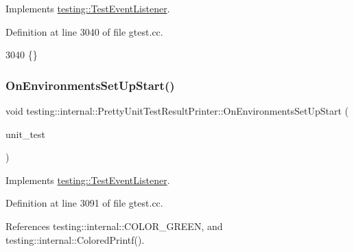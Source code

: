 Implements \hyperlink{classtesting_1_1TestEventListener_aaa1021d75f5dbf3f05c829c1cc520341}{testing\+::\+Test\+Event\+Listener}.



Definition at line 3040 of file gtest.\+cc.


\begin{DoxyCode}
3040 \{\}
\end{DoxyCode}
\mbox{\label{classtesting_1_1internal_1_1PrettyUnitTestResultPrinter_a846a5e82b421e04fcdd2b1b2b64b162f}} 
\subsubsection{\texorpdfstring{On\+Environments\+Set\+Up\+Start()}{OnEnvironmentsSetUpStart()}}
{\footnotesize\ttfamily void testing\+::internal\+::\+Pretty\+Unit\+Test\+Result\+Printer\+::\+On\+Environments\+Set\+Up\+Start (\begin{DoxyParamCaption}\item[{const \hyperlink{classtesting_1_1UnitTest}{Unit\+Test} \&}]{unit\+\_\+test }\end{DoxyParamCaption})\hspace{0.3cm}{\ttfamily [virtual]}}



Implements \hyperlink{classtesting_1_1TestEventListener_aa6502e534919605be45f26a6daf9a40c}{testing\+::\+Test\+Event\+Listener}.



Definition at line 3091 of file gtest.\+cc.



References testing\+::internal\+::\+C\+O\+L\+O\+R\+\_\+\+G\+R\+E\+EN, and testing\+::internal\+::\+Colored\+Printf().


